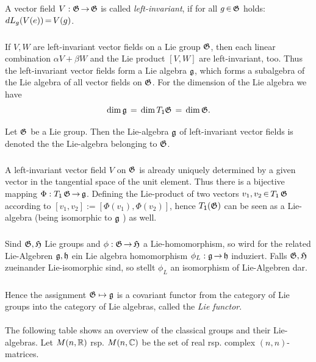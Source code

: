 \documentclass[11pt,twoside]{article}
\begin{document}
\begin{definition}
A vector field $V:\mathfrak{G} {\,\to\,} \mathfrak{G}$ is called \textit{left-invariant},
if for all $g {\,\in\,} \mathfrak{G}$ holds: $dL_g(V(e)) {\,=\,} V(g)$.
\end{definition}

\subparagraph{}
If $V,W$ are left-invariant vector fields on a Lie group $\mathfrak{G}$,
then each linear combination $\alpha V + \beta W$
and the Lie product $[V,W]$ are left-invariant,
too.
Thus the left-invariant vector fields form a Lie algebra ${\mathfrak{g}}$,
which forms a subalgebra of the Lie algebra of all vector fields on $\mathfrak{G}$.
For the dimension of the Lie algebra we have
\[
\operatorname{dim} {\mathfrak{g}} \,=\, \operatorname{dim} T_{{\mathsf{1}}} \mathfrak{G} \,=\, \operatorname{dim} \mathfrak{G}.
\]

\begin{definition}
Let $\mathfrak{G}$ be a Lie group.
Then the Lie-algebra ${\mathfrak{g}}$ of left-invariant vector fields is denoted
the the Lie-algebra belonging to $\mathfrak{G}$.
\end{definition}

\subparagraph{}
A left-invariant vector field $V$ on $\mathfrak{G}$ is already uniquely determined
by a given vector in the tangential space of the unit element.
Thus there is a bijective mapping $\Phi: T_{{\mathsf{1}}}\,\mathfrak{G} {\,\to\,} {\mathfrak{g}}$.
Defining the Lie-product of two vectors $v_1,v_2 {\,\in\,} T_{{\mathsf{1}}}\,\mathfrak{G}$
according to
$[v_1,v_2] := [\Phi(v_1),\Phi(v_2)]$,
hence $T_{{\mathsf{1}}}(\mathfrak{G})$ can be seen as a Lie-algebra (being isomorphic to ${\mathfrak{g}}$ ) as well.

\subparagraph{}
Sind $\mathfrak{G},\mathfrak{H}$ Lie groups
and $\phi:\mathfrak{G} {\,\to\,} \mathfrak{H}$ a Lie-homomorphism,
so wird for the related Lie-Algebren ${\mathfrak{g}},{\mathfrak{h}}$ ein
Lie algebra homomorphism $\phi_L:{\mathfrak{g}} {\,\to\,} {\mathfrak{h}}$ induziert.
Falls $\mathfrak{G},\mathfrak{H}$ zueinander Lie-isomorphic sind,
so stellt $\phi_L$ an isomorphism of Lie-Algebren dar.

\subparagraph{}
Hence the assignment $\mathfrak{G} \mapsto {\mathfrak{g}}$ is a covariant functor
from the category of Lie groups into the category of Lie algebras,
called the \textit{Lie functor}.

\paragraph{}
The following table shows an overview of the classical groups and their
Lie-algebras.
Let $M(n,{\mathbb{R}})$ rsp. $M(n,{\mathbb{C}})$ be the set of real rsp. complex $(n,n)$-matrices.
\vspace{2mm}
\end{document}
